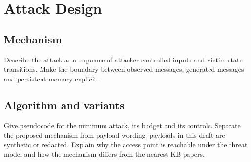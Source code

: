 \section{Attack Design}
\subsection{Mechanism}
Describe the attack as a sequence of attacker-controlled inputs and victim state transitions. Make the boundary
between observed messages, generated messages and persistent memory explicit.
\subsection{Algorithm and variants}
Give pseudocode for the minimum attack, its budget and its controls. Separate the proposed mechanism from payload
wording; payloads in this draft are synthetic or redacted. Explain why the access point is reachable under the
threat model and how the mechanism differs from the nearest KB papers.
